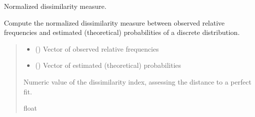 \documentclass[letterpaper,10pt,english]{sphinxmanual}
\begin{document}
\begin{fulllineitems}
\label{\detokenize{cubmods:cubmods.general.dissimilarity}}
\pysigstartsignatures
{}
\pysigstopsignatures
\sphinxAtStartPar
Normalized dissimilarity measure.

\sphinxAtStartPar
Compute the normalized dissimilarity measure between observed
relative frequencies and estimated (theoretical) probabilities of a discrete distribution.
\begin{quote}\begin{description}
\begin{itemize}
\item {} 
\sphinxAtStartPar
{} () \textendash{} Vector of observed relative frequencies

\item {} 
\sphinxAtStartPar
{} () \textendash{} Vector of estimated (theoretical) probabilities

\end{itemize}

\sphinxAtStartPar
Numeric value of the dissimilarity index, assessing the distance to a perfect fit.

\sphinxAtStartPar
float

\end{description}\end{quote}

\end{fulllineitems}

\end{document}
